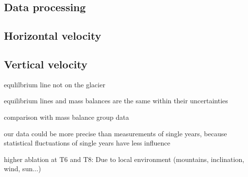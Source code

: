 \subsection{Data processing}


\subsection{Horizontal velocity}


\subsection{Vertical velocity}


equlilbrium line not on the glacier

equilibrium lines and mass balances are the same within their uncertainties


comparison with mass balance group data

our data could be more precise than measurements of single years, because statistical fluctuations of single years have less influence



higher ablation at T6 and T8: Due to local environment (mountains, inclination, wind, sun...)




